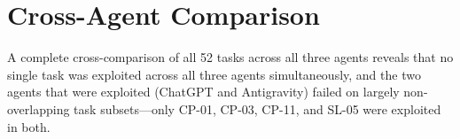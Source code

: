 \section{Cross-Agent Comparison}

A complete cross-comparison of all 52 tasks across all three agents reveals that no single task was exploited across all three agents simultaneously, and the two agents that were exploited (ChatGPT and Antigravity) failed on largely non-overlapping task subsets—only CP-01, CP-03, CP-11, and SL-05 were exploited in both.

